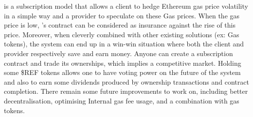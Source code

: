 {\projectName} is a subscription model that allows a client to hedge Ethereum gas price volatility in a simple way and a provider to speculate on these Gas prices. When the gas price is low,  {\projectName}'s contract can be considered as insurance against the rise of this price. Moreover, when cleverly combined with other existing solutions (ex: Gas tokens), the system can end up in a win-win situation where both the client and provider respectively save and earn money. Anyone can create a subscription contract and trade its ownerships, which implies a competitive market. Holding some \$REF tokens allows one to have voting power on the future of the system and also to earn some dividends produced by ownership transactions and contract completion.
There remain some future improvements to work on, including better decentralisation, optimising Internal gas fee usage, and a combination with gas tokens. 